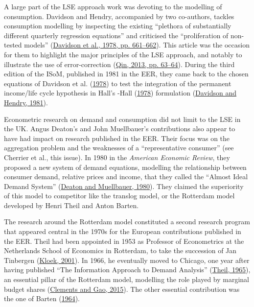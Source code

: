 \documentclass[
  12pt,
  onecolumn]{article}
\begin{document}
A large part of the LSE approach work was devoting to the modelling of
consumption. Davidson and Hendry, accompanied by two co-authors, tackles
consumption modelling by inspecting the existing ``plethora of
substantially different quarterly regression equations'' and criticised
the ``proliferation of non-tested models''
(\protect\hyperlink{ref-davidson1978}{Davidson et al., 1978, pp.
661--662}). This article was the occasion for them to highlight the
major principles of the LSE approach, and notably to illustrate the use
of error-correction (\protect\hyperlink{ref-qin2013a}{Qin, 2013, pp.
63--64}). During the third edition of the ISoM, published in 1981 in the
EER, they came back to the chosen equations of Davidson et al.
(\protect\hyperlink{ref-davidson1978}{1978}) to test the integration of
the permanent income/life cycle hypothesis in Hall's -Hall
(\protect\hyperlink{ref-hall1978b}{1978}) formulation
(\protect\hyperlink{ref-davidson1981}{Davidson and Hendry, 1981}).

Econometric research on demand and consumption did not limit to the LSE
in the UK. Angus Deaton's and John Muellbauer's contributions also
appear to have had impact on research published in the EER. Their focus
was on the aggregation problem and the weaknesses of a ``representative
consumer'' (see Cherrier et al., this issue). In 1980 in the
\emph{American Economic Review}, they proposed a new system of demand
equations, modelling the relationship between consumer demand, relative
prices and income, that they called the ``Almost Ideal Demand System''
(\protect\hyperlink{ref-deaton1980}{Deaton and Muellbauer, 1980}). They
claimed the superiority of this model to competitor like the translog
model, or the Rotterdam model developed by Henri Theil and Anton Barten.

The research around the Rotterdam model constituted a second research
program that appeared central in the 1970s for the European
contributions published in the EER. Theil had been appointed in 1953 as
Professor of Econometrics at the Netherlands School of Economics in
Rotterdam, to take the succession of Jan Tinbergen
(\protect\hyperlink{ref-kloek2001}{Kloek, 2001}). In 1966, he eventually
moved to Chicago, one year after having published ``The Information
Approach to Demand Analysis'' (\protect\hyperlink{ref-theil1965}{Theil,
1965}), an essential pillar of the Rotterdam model, modelling the role
played by marginal budget shares
(\protect\hyperlink{ref-clements2015a}{Clements and Gao, 2015}). The
other essential contribution was the one of Barten
(\protect\hyperlink{ref-barten1964}{1964}).
\end{document}
